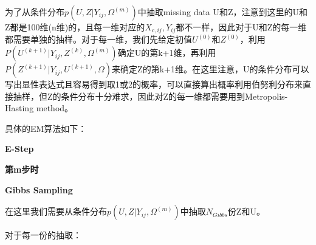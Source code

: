 \documentclass[11pt]{article}
\begin{document}
为了从条件分布$p(U,Z|Y_{ij},\Omega^{(m)})$中抽取missing data U和Z，注意到这里的U和Z都是100维(n维)的，且每一维对应的$X_{c,ij},Y_{ij}$都不一样，因此对于U和Z的每一维都需要单独的抽样。对于每一维，我们先给定初值$U^{(0)}$和$Z^{(0)}$，利用$P(U^{(k+1)}|Y_{ij},Z^{(k)},\Omega^{(m)})$确定U的第k+1维，再利用$P(Z^{(k+1)}|Y_{ij},U^{(k+1)},\Omega)$来确定Z的第k+1维。在这里注意，U的条件分布可以写出显性表达式且容易得到取1或2的概率，可以直接算出概率利用伯努利分布来直接抽样，但Z的条件分布十分难求，因此对Z的每一维都需要用到Metropolis-Hasting method。

具体的EM算法如下：

\centerline{\textbf{E-Step}}

\centerline{\textbf{第m步时}}

\centerline{\textbf{Gibbs Sampling}}
在这里我们需要从条件分布$p(U,Z|Y_{ij},\Omega^{(m)})$中抽取$N_{Gibbs}$份Z和U。

对于每一份的抽取：
\end{document}
